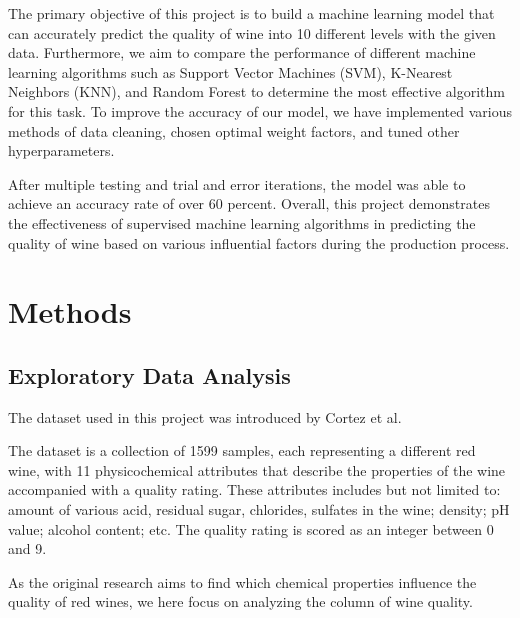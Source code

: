 \documentclass[conference]{IEEEtran}
\begin{document}
The primary objective of this project is to build a machine learning model that can accurately predict the quality of wine into 10 different levels with the given data. Furthermore, we aim to compare the performance of different machine learning algorithms such as Support Vector Machines (SVM), K-Nearest Neighbors (KNN), and Random Forest to determine the most effective algorithm for this task. To improve the accuracy of our model, we have implemented various methods of data cleaning, chosen optimal weight factors, and tuned other hyperparameters.

After multiple testing and trial and error iterations, the model was able to achieve an accuracy rate of over 60 percent. Overall, this project demonstrates the effectiveness of supervised machine learning algorithms in predicting the quality of wine based on various influential factors during the production process.\\

\section{Methods}
\subsection{Exploratory Data Analysis}


The dataset used in this project was introduced by Cortez et al.\cite{b2}

The dataset is a collection of 1599 samples, each representing a different red wine, with 11 physicochemical attributes that describe the properties of the wine accompanied with a quality rating. These attributes includes but not limited to: amount of various acid, residual sugar, chlorides, sulfates in the wine; density; pH value; alcohol content; etc. The quality rating is scored as an integer between 0 and 9.

As the original research aims to find which chemical properties influence the quality of red wines, we here focus on analyzing the column of wine quality.
\end{document}
